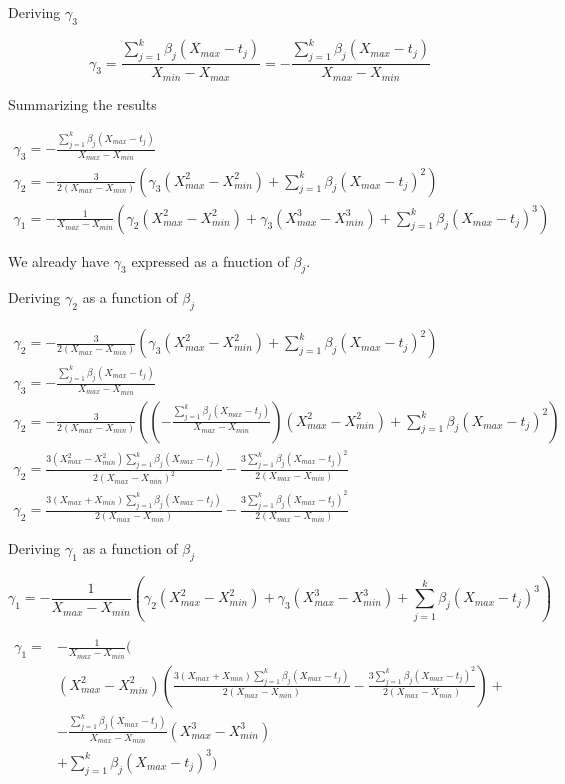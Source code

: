 \documentclass{article}
\begin{document}
Deriving \( \gamma_3 \)

\[
\gamma_3 =\frac{\sum_{j=1}^k\beta_j (X_{max}-t_j)}{X_{min}-X_{max}}=-\frac{\sum_{j=1}^k\beta_j (X_{max}-t_j)}{X_{max}-X_{min}}
\]


\clearpage
Summarizing the results

\begin{gather}
\gamma_3 =-\frac{\sum_{j=1}^k\beta_j (X_{max}-t_j)}{X_{max}-X_{min}} \\
\gamma_2=-\frac{3}{2 (X_{max}-X_{min})} \left( \gamma_3 (X^2_{max}-X^2_{min}) + \sum_{j=1}^k\beta_j (X_{max}-t_j)^2     \right) \\
\gamma_1  = -\frac{1}{X_{max}-X_{min}} \left(\gamma_2 (X^2_{max}-X^2_{min})+ \gamma_3 (X_{max}^3-X^3_{min}) + \sum_{j=1}^k\beta_j (X_{max}-t_j)^3\right)
\end{gather}

We already have \( \gamma_3 \) expressed as a fnuction of \( \beta_j \). 

Deriving \( \gamma_2 \) as a function of \( \beta_j \)

\begin{gather*}
\gamma_2=-\frac{3}{2 (X_{max}-X_{min})} \left( \gamma_3 (X^2_{max}-X^2_{min}) + \sum_{j=1}^k\beta_j (X_{max}-t_j)^2     \right) \\
\gamma_3 =-\frac{\sum_{j=1}^k\beta_j (X_{max}-t_j)}{X_{max}-X_{min}} \\
\gamma_2=-\frac{3}{2 (X_{max}-X_{min})} \left( \left( -\frac{\sum_{j=1}^k\beta_j (X_{max}-t_j)}{X_{max}-X_{min}} \right)  (X^2_{max}-X^2_{min}) + \sum_{j=1}^k\beta_j (X_{max}-t_j)^2     \right) \\
\gamma_2= \frac{3(X^2_{max}-X^2_{min}) \sum_{j=1}^k\beta_j (X_{max}-t_j) }{2 (X_{max}-X_{min})^2} 
-\frac{3  \sum_{j=1}^k\beta_j (X_{max}-t_j)^2  }{2 (X_{max}-X_{min})} \\
\gamma_2= \frac{3(X_{max}+X_{min}) \sum_{j=1}^k\beta_j (X_{max}-t_j) }{2 (X_{max}-X_{min})} 
-\frac{3  \sum_{j=1}^k\beta_j (X_{max}-t_j)^2  }{2 (X_{max}-X_{min})}    
\end{gather*}

\clearpage 
Deriving \(\gamma_1 \) as a function of \( \beta_j \)

\[
\gamma_1  = -\frac{1}{X_{max}-X_{min}} \left(\gamma_2 (X^2_{max}-X^2_{min})+ \gamma_3 (X_{max}^3-X^3_{min}) + \sum_{j=1}^k\beta_j (X_{max}-t_j)^3\right)
\]

\begin{equation*}
\begin{aligned}
 \gamma_1  = &    -\frac{1}{X_{max}-X_{min}} \Biggl( \\
&  (X^2_{max}-X^2_{min}) \left(\frac{3(X_{max}+X_{min}) \sum_{j=1}^k\beta_j (X_{max}-t_j) }{2 (X_{max}-X_{min})} 
-\frac{3  \sum_{j=1}^k\beta_j (X_{max}-t_j)^2  }{2 (X_{max}-X_{min})} \right) + \\
& -\frac{\sum_{j=1}^k\beta_j (X_{max}-t_j)}{X_{max}-X_{min}} (X_{max}^3-X^3_{min})\\
& + \sum_{j=1}^k\beta_j (X_{max}-t_j)^3\Biggr)\\
\end{aligned}
\end{equation*}
\end{document}
